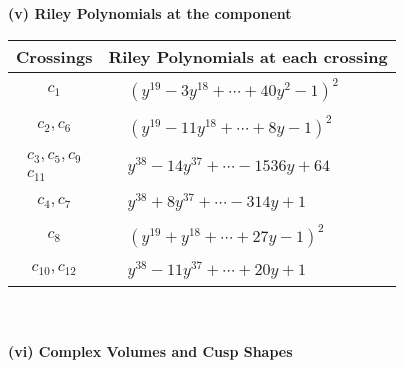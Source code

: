 \documentclass[1p]{elsarticle_modified}
\theoremstyle{definition}
\begin{document}
\newpage\renewcommand{\arraystretch}{1}
\flushleft \textbf{(v) Riley Polynomials at the component}\newline \\
\begin{tabular}{m{50pt}|m{274pt}}
Crossings & \hspace{64pt}Riley Polynomials at each crossing \\
\hline $$\begin{aligned}c_{1}\end{aligned}$$&$\begin{aligned}
&(y^{19}-3 y^{18}+\cdots+40 y^2-1)^{2}
\end{aligned}$\\
\hline $$\begin{aligned}c_{2},c_{6}\end{aligned}$$&$\begin{aligned}
&(y^{19}-11 y^{18}+\cdots+8 y-1)^{2}
\end{aligned}$\\
\hline $$\begin{aligned}c_{3},c_{5},c_{9}\\c_{11}\end{aligned}$$&$\begin{aligned}
&y^{38}-14 y^{37}+\cdots-1536 y+64
\end{aligned}$\\
\hline $$\begin{aligned}c_{4},c_{7}\end{aligned}$$&$\begin{aligned}
&y^{38}+8 y^{37}+\cdots-314 y+1
\end{aligned}$\\
\hline $$\begin{aligned}c_{8}\end{aligned}$$&$\begin{aligned}
&(y^{19}+y^{18}+\cdots+27 y-1)^{2}
\end{aligned}$\\
\hline $$\begin{aligned}c_{10},c_{12}\end{aligned}$$&$\begin{aligned}
&y^{38}-11 y^{37}+\cdots+20 y+1
\end{aligned}$\\
\hline
\end{tabular}\\~\\
\newpage\flushleft \textbf{(vi) Complex Volumes and Cusp Shapes}
\end{document}
